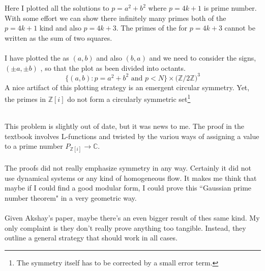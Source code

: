 \documentclass[12pt]{article}
\begin{document}
\noindent Here I plotted all the solutions to $p = a^2 + b^2$ where $p = 4k+1$ is prime number.  With some effort we can show there infinitely many primes both of the $p =4k+1$ kind and also $p = 4k+3$.  The primes of the for $p = 4k+3$ cannot be written as the sum of two squares. \\ \\
I have plotted the as $(a,b)$ and also $(b,a)$ and we need to consider the signs, $(\pm a,\pm b)$ , so that the plot as been divided into octants. 
$$  \{ (a,b) : p = a^2 + b^2 \text{ and } p < N \} \times \big( \mathbb{Z}/2\mathbb{Z}\big)^3 $$
A nice artifact of this plotting strategy is an emergent circular symmetry.  Yet, the primes in $\mathbb{Z}[i]$ do not form a circularly symmetric set\footnote{The symmetry itself has to be corrected by a small error term.} \\ \\
 
\vspace{-24pt}

\noindent This problem is slightly out of date, but it was news to me.  The proof in the textbook involves L-functions and twisted by the variou ways of assigning a value to a prime number $P_{\mathbb{Z}[i]} \to \mathbb{C}$.  \\ \\ 
The proofs did not really emphasize symmetry in any way. Certainly it did not use dynamical systems or any kind of homogeneous flow.  It makes me think that maybe if I could find a good modular form, I could prove this ``Gaussian prime number theorem" in a very geometric way. \\ \\
Given Akshay's paper, maybe there's an even bigger result of thes same kind.   My only complaint is they don't really prove anything too tangible.  Instead, they outline a general strategy that should work in all cases. 
\end{document}
